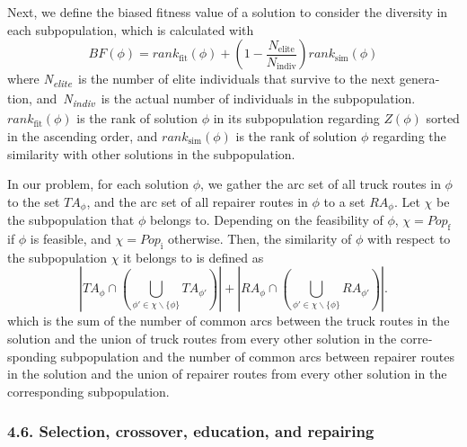 \documentclass[
  english,
]{article}
\begin{document}
\begin{otherlanguage}{english}
\protect{}\label{p0570}
Next, we define the biased fitness value of a solution to consider the diversity in each
subpopulation, which is calculated
with\[\tag{71}BF(\phi) = rank_{\text{fit}}(\phi) + \left( {1 - \frac{N_{\text{elite}}}{N_{\text{indiv}}}} \right)rank_{\text{sim}}(\phi)\]where
\emph{N\textsubscript{elite}}~is the number of elite individuals that survive to the next
generation, and~\emph{N\textsubscript{indiv}}~is the actual number of individuals in the
subpopulation. \(\mathit{ran}k_{\text{fit}}(\phi)\) is the rank of solution \(\phi\) in its
subpopulation regarding \(Z(\phi)\) sorted in the ascending order, and
\(\mathit{ran}k_{\text{sim}}(\phi)\) is the rank of solution \(\phi\) regarding the similarity with
other solutions in the subpopulation.

\protect{}\label{p0575}
In our problem, for each solution \(\phi\), we gather the arc set of all truck routes in \(\phi\) to
the set \(TA_{\phi}\), and the arc set of all repairer routes in \(\phi\) to a set \(RA_{\phi}\).
Let \(\chi\) be the subpopulation that \(\phi\) belongs to. Depending on the feasibility of
\(\phi\), \(\chi = Pop_{\text{f}}\) if \(\phi\) is feasible, and \(\chi = Pop_{\text{i}}\)
otherwise. Then, the similarity of \(\phi\) with respect to the subpopulation \(\chi\) it belongs to
is defined
as\[\tag{72}\left| {TA_{\phi} \cap \left( {\bigcup\limits_{\phi' \in \chi \smallsetminus {\{\phi\}}}{TA_{\phi'}}} \right)} \right| + \left| {RA_{\phi} \cap \left( {\bigcup\limits_{\phi' \in \chi \smallsetminus {\{\phi\}}}{RA_{\phi'}}} \right)} \right|.\]which
is the sum of the number of common arcs between the truck routes in the solution and the union of
truck routes from every other solution in the corresponding subpopulation and the number of common
arcs between repairer routes in the solution and the union of repairer routes from every other
solution in the corresponding subpopulation.

\protect{}\label{s0095}
\subsubsection{4.6. Selection, crossover, education, and repairing}\label{st115}


\end{otherlanguage}
\end{document}
